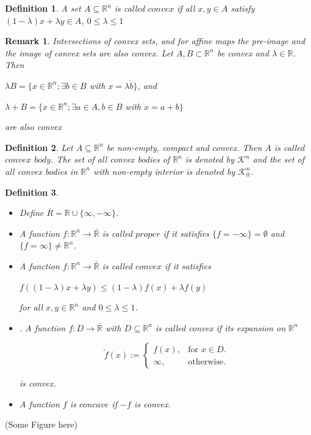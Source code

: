 \documentclass[a4paper]{book}
\newtheorem{remark}{Remark}%
\newtheorem{definition}{Definition}%
\begin{document}
\begin{definition}
	A set $A\subseteq\mathbb{R}^n$ is called $convex$ if all $x,y\in A$ satisfy $(1-\lambda)x+\lambda y\in A$, $0\leq\lambda\leq1$
\end{definition}

\begin{remark}
	Intersections of convex sets, and for affine maps the pre-image and the image of convex sets are also convex. Let $A, B \subset\mathbb{R}^n$ be convex and $\lambda\in\mathbb{R}$. Then
	\begin{center}
		$\lambda B=\{x\in\mathbb{R}^n;\exists b\in B$ with $x=\lambda\dot b\}$, and
	
		$\lambda+B=\{x\in\mathbb{R}^n;\exists a\in A, b\in B$ with $x=a+b\}$
	\end{center}
	are also convex
\end{remark}

\begin{definition}
	Let $A\subseteq\mathbb{R}^n$ be non-empty, compact and convex. Then $A$ is called $convex$ $body$. The set of all convex bodies of $\mathbb{R}^n$ is denoted by $\mathscr{K}^n$ and the set of all convex bodies in $\mathbb{R}^n$ with non-empty interior is denoted by $\mathscr{K}_{0}^{n}$.
\end{definition}

\begin{definition}
	\begin{itemize}
		\item Define $\bar{R}=\mathbb{R}\cup\{ \infty,-\infty\}$.
		\item A function $f:\mathbb{R}^n\to\bar{\mathbb{R}}$ is called $proper$ if it satisfies $\{f=-\infty\}=\emptyset$ and $\{f=\infty\}\neq\mathbb{R}^n$.
		\item A function $f:\mathbb{R}^n\to\bar{\mathbb{R}}$ is called $convex$ if it satisfies 
		\begin{center}
			$f((1-\lambda)x+\lambda y)\leq(1-\lambda)f(x)+\lambda f(y)$
		\end{center}
		for all $x, y\in\mathbb{R}^n$ and $0\leq\lambda\leq1$.
		\item . A function $f:D\to\bar{\mathbb{R}}$ with $D\subseteq\mathbb{R}^n$ is called convex if its expansion on $\mathbb{R}^n$
		\begin{center}
			\begin{equation}
				  \tilde{f}(x):=\begin{cases}
				    	f(x), & \text{for $x\in D$}.\\
				   	 \infty, & \text{otherwise}.
				  \end{cases}
			\end{equation}
		\end{center}
		is convex.
		\item A function $f$ is $concave$ if $-f$ is convex.
	\end{itemize}
\end{definition}
(Some Figure here)
\end{document}
